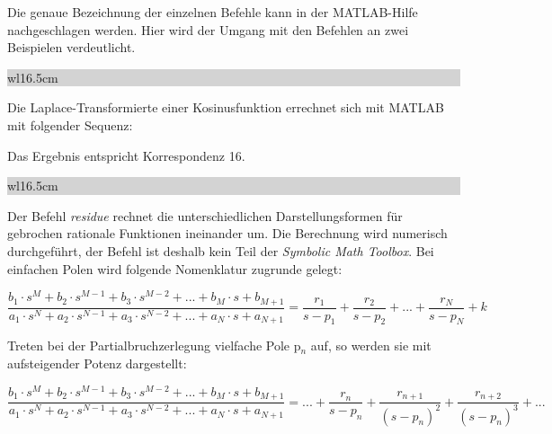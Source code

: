 \noindent Die genaue Bezeichnung der einzelnen Befehle kann in der MATLAB-Hilfe nachgeschlagen werden. Hier wird der Umgang mit den Befehlen an zwei Beispielen verdeutlicht.\bigskip

\noindent
\colorbox{lightgray}{%
%
\renewcommand\arraystretch{0.6}%
\begin{tabular}{ wl{16.5cm} }
{\selectfont{Beispiel: Laplace-Transformation einer Winkelfunktion mit MATLAB} }
\end{tabular}%
}\medskip

\noindent Die Laplace-Transformierte einer Kosinusfunktion errechnet sich mit MATLAB mit folgender Sequenz:



\noindent Das Ergebnis entspricht Korrespondenz 16.

\clearpage

\noindent
\colorbox{lightgray}{%
%
\renewcommand\arraystretch{0.6}%
\begin{tabular}{ wl{16.5cm} }
{\selectfont{Beispiel: Partialbruchzerlegung mit MATLAB} }
\end{tabular}%
}\medskip

\noindent Der Befehl \textit{residue} rechnet die unterschiedlichen Darstellungsformen f\"{u}r gebrochen rationale Funktionen ineinander um. Die Berechnung wird numerisch durchgef\"{u}hrt, der Befehl ist deshalb kein Teil der \textit{Symbolic Math Toolbox}. Bei einfachen Polen wird folgende Nomenklatur zugrunde gelegt:

\begin{equation}\label{eq:fourhundredsfiftynine}
\frac{b_{1} \cdot s^{M} +b_{2} \cdot s^{M-1} +b_{3} \cdot s^{M-2} +...+b_{M} \cdot s+b_{M+1} }{a_{1} \cdot s^{N} +a_{2} \cdot s^{N-1} +a_{3} \cdot s^{N-2} +...+a_{N} \cdot s+a_{N+1} } =\frac{r_{1} }{s-p_{1} } +\frac{r_{2} }{s-p_{2} } +...+\frac{r_{N} }{s-p_{N} } +k
\end{equation}

\noindent Treten bei der Partialbruchzerlegung vielfache Pole p${}_{n}$ auf, so werden sie mit aufsteigender Potenz dargestellt:

\begin{equation}\label{eq:fourhundredsixty}
\frac{b_{1} \cdot s^{M} +b_{2} \cdot s^{M-1} +b_{3} \cdot s^{M-2} +...+b_{M} \cdot s+b_{M+1} }{a_{1} \cdot s^{N} +a_{2} \cdot s^{N-1} +a_{3} \cdot s^{N-2} +...+a_{N} \cdot s+a_{N+1} } =...+\frac{r_{n} }{s-p_{n} } +\frac{r_{n+1} }{\left(s-p_{n} \right)^{2} } +\frac{r_{n+2} }{\left(s-p_{n} \right)^{3} } +...
\end{equation}

